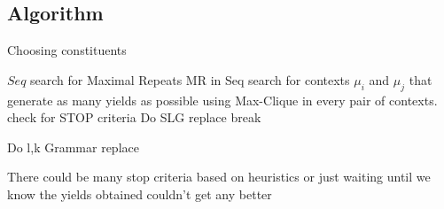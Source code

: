 \subsection{Algorithm}
\begin{algorithm}
\caption{Choosing constituents}
\begin{algorithmic}[1]
\REQUIRE $Seq$
\STATE search for Maximal Repeats MR in Seq
	\STATE search for contexts $\mu_i$ and $\mu_j$ that generate as many yields as possible using Max-Clique in every pair of contexts.
	\STATE check for STOP criteria
	\STATE Do SLG replace
	\STATE break
	\ENDIF






\ENDWHILE

\STATE Do l,k Grammar replace

\end{algorithmic}
\end{algorithm}

There could be many stop criteria based on heuristics or just waiting until we know the yields obtained couldn't get any better

